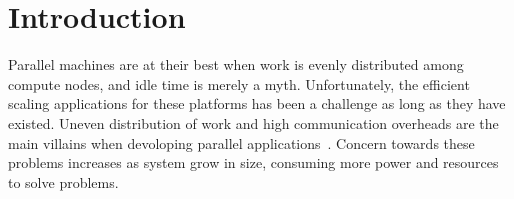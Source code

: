 \section{Introduction}


%
%
%
%
%
%
%
%
%

Parallel machines are at their best when work is evenly distributed among compute nodes, and idle time is merely a myth.
Unfortunately, the efficient scaling applications for these platforms has been a challenge as long as they have existed.
Uneven distribution of work and high communication overheads are the main villains when devoloping parallel applications~\cite{Deveci2015, commaware}.
Concern towards these problems increases as system grow in size, consuming more power and resources to solve problems.

